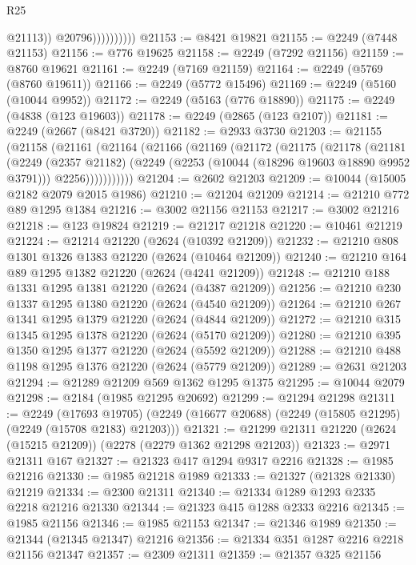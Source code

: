 \begin{lexlean}{R25}
\begin{coremodule}
                            @21113))
                        @20796))))))))))
@21153 := @8421 @19821
@21155 := @2249 (@7448 @21153)
@21156 := @776 @19625
@21158 := @2249 (@7292 @21156)
@21159 := @8760 @19621
@21161 := @2249 (@7169 @21159)
@21164 := @2249 (@5769 (@8760 @19611))
@21166 := @2249 (@5772 @15496)
@21169 := @2249 (@5160 (@10044 @9952))
@21172 := @2249 (@5163 (@776 @18890))
@21175 := @2249 (@4838 (@123 @19603))
@21178 := @2249 (@2865 (@123 @2107))
@21181 := @2249 (@2667 (@8421 @3720))
@21182 := @2933 @3730
@21203 := @21155
    (@21158
      (@21161
        (@21164
          (@21166
            (@21169
              (@21172
                (@21175
                  (@21178
                    (@21181
                      (@2249
                        (@2357 @21182)
                        (@2249 (@2253 (@10044 (@18296 @19603 @18890 @9952 @3791))) @2256)))))))))))
@21204 := @2602 @21203
@21209 := @10044 (@15005 @2182 @2079 @2015 @1986)
@21210 := @21204 @21209
@21214 := @21210 @772 @89 @1295 @1384
@21216 := @3002 @21156 @21153
@21217 := @3002 @21216
@21218 := @123 @19824
@21219 := @21217 @21218
@21220 := @10461 @21219
@21224 := @21214 @21220 (@2624 (@10392 @21209))
@21232 := @21210 @808 @1301 @1326 @1383 @21220 (@2624 (@10464 @21209))
@21240 := @21210 @164 @89 @1295 @1382 @21220 (@2624 (@4241 @21209))
@21248 := @21210 @188 @1331 @1295 @1381 @21220 (@2624 (@4387 @21209))
@21256 := @21210 @230 @1337 @1295 @1380 @21220 (@2624 (@4540 @21209))
@21264 := @21210 @267 @1341 @1295 @1379 @21220 (@2624 (@4844 @21209))
@21272 := @21210 @315 @1345 @1295 @1378 @21220 (@2624 (@5170 @21209))
@21280 := @21210 @395 @1350 @1295 @1377 @21220 (@2624 (@5592 @21209))
@21288 := @21210 @488 @1198 @1295 @1376 @21220 (@2624 (@5779 @21209))
@21289 := @2631 @21203
@21294 := @21289 @21209 @569 @1362 @1295 @1375
@21295 := @10044 @2079
@21298 := @2184 (@1985 @21295 @20692)
@21299 := @21294 @21298
@21311 := @2249
    (@17693 @19705)
    (@2249 (@16677 @20688) (@2249 (@15805 @21295) (@2249 (@15708 @2183) @21203)))
@21321 := @21299 @21311 @21220 (@2624 (@15215 @21209)) (@2278 (@2279 @1362 @21298 @21203))
@21323 := @2971 @21311 @167
@21327 := @21323 @417 @1294 @9317 @2216
@21328 := @1985 @21216
@21330 := @1985 @21218 @1989
@21333 := @21327 (@21328 @21330) @21219
@21334 := @2300 @21311
@21340 := @21334 @1289 @1293 @2335 @2218 @21216 @21330
@21344 := @21323 @415 @1288 @2333 @2216
@21345 := @1985 @21156
@21346 := @1985 @21153
@21347 := @21346 @1989
@21350 := @21344 (@21345 @21347) @21216
@21356 := @21334 @351 @1287 @2216 @2218 @21156 @21347
@21357 := @2309 @21311
@21359 := @21357 @325 @21156

\end{coremodule}
\end{lexlean}
